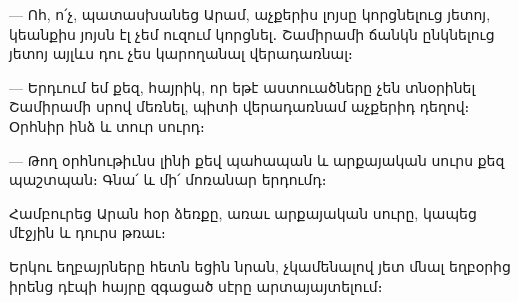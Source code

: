 \documentclass{article}
\begin{document}
{— Ոհ, ո՛չ, պատասխանեց Արամ, աչքերիս լոյսը կորցնելուց յետոյ, կեանքիս յոյսն էլ չեմ ուզում կորցնել․ Շամիրամի ճանկն ընկնելուց յետոյ այլևս դու չես կարողանալ վերադառնալ։

— Երդւում եմ քեզ, հայրիկ, որ եթէ աստուածները չեն տնօրինել Շամիրամի սրով մեռնել, պիտի վերադառնամ աչքերիդ դեղով։ Օրհնիր ինձ և տուր սուրդ։

— Թող օրհնութիւնս լինի քեվ պահապան և արքայական սուրս քեզ պաշտպան։ Գնա՛ և մի՛ մոռանար երդումդ։

Համբուրեց Արան հօր ձեռքը, առաւ արքայական սուրը, կապեց մէջյին և դուրս թռաւ։

Երկու եղբայրները հետն եցին նրան, չկամենալով յետ մնալ եղբօրից իրենց դէպի հայրը զգացած սէրը արտայայտելում։}
\clearpage
\section{}
\end{document}
